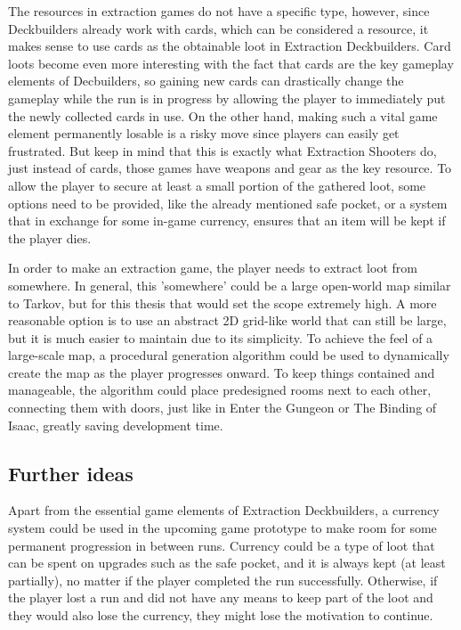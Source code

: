 The resources in extraction games do not have a specific type, however, since Deckbuilders already work with cards, which can be considered a resource, it makes sense to use cards as the obtainable loot in Extraction Deckbuilders. Card loots become even more interesting with the fact that cards are the key gameplay elements of Decbuilders, so gaining new cards can drastically change the gameplay while the run is in progress by allowing the player to immediately put the newly collected cards in use. On the other hand, making such a vital game element permanently losable is a risky move since players can easily get frustrated. But keep in mind that this is exactly what Extraction Shooters do, just instead of cards, those games have weapons and gear as the key resource. To allow the player to secure at least a small portion of the gathered loot, some options need to be provided, like the already mentioned safe pocket, or a system that in exchange for some in-game currency, ensures that an item will be kept if the player dies.

In order to make an extraction game, the player needs to extract loot from somewhere. In general, this 'somewhere' could be a large open-world map similar to Tarkov\cite{escapeFromTarkov2017}, but for this thesis that would set the scope extremely high. A more reasonable option is to use an abstract 2D grid-like world that can still be large, but it is much easier to maintain due to its simplicity. To achieve the feel of a large-scale map, a procedural generation algorithm\cite{van2013procedural} could be used to dynamically create the map as the player progresses onward. To keep things contained and manageable, the algorithm could place predesigned rooms next to each other, connecting them with doors, just like in Enter the Gungeon\cite{enterTheGungeon2016} or The Binding of Isaac\cite{theBindingOfIsaacRebirth2014}, greatly saving development time.



\subsection{Further ideas}

Apart from the essential game elements of Extraction Deckbuilders, a currency system could be used in the upcoming game prototype to make room for some permanent progression in between runs. Currency could be a type of loot that can be spent on upgrades such as the safe pocket, and it is always kept (at least partially), no matter if the player completed the run successfully. Otherwise, if the player lost a run and did not have any means to keep part of the loot and they would also lose the currency, they might lose the motivation to continue.

